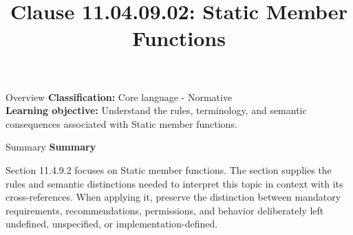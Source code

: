 \documentclass[10pt,letterpaper]{article}
\title{Clause 11.04.09.02: Static Member Functions}
\author{}
\date{}
\begin{document}
\maketitle
\begin{CornellOverviewBox}{Overview}
\textbf{Classification:} Core language - Normative\\[2pt]
\textbf{Learning objective:} Understand the rules, terminology, and semantic consequences associated with Static member functions.
\end{CornellOverviewBox}\begin{CornellSummaryBox}{Summary}
{\sffamily\bfseries\color{Accent} Summary}\par\vspace{3pt}Section 11.4.9.2 focuses on Static member functions. The section supplies the rules and semantic distinctions needed to interpret this topic in context with its cross-references. When applying it, preserve the distinction between mandatory requirements, recommendations, permissions, and behavior deliberately left undefined, unspecified, or implementation-defined.
\end{CornellSummaryBox}
\end{document}

